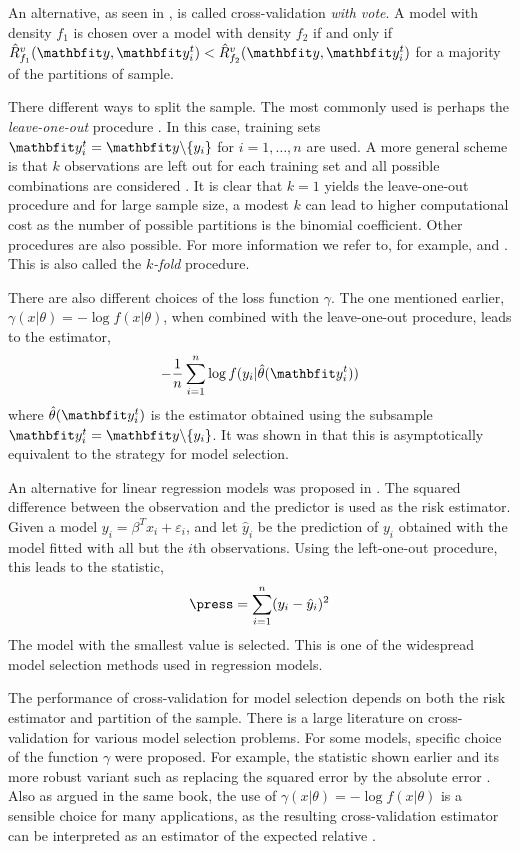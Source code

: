 An alternative, as seen in \cite{Yang:2007vx}, is called cross-validation
\emph{with vote}. A model with density $f_1$ is chosen over a model with
density $f_2$ if and only if $\hat{R}_{f_1}^v(\data,\data_i^t) <
\hat{R}_{f_2}^v(\data,\data_i^t)$ for a majority of the partitions of sample.

There different ways to split the sample. The most commonly used is perhaps
the \emph{leave-one-out} procedure \cite{Stone:1974vx,Geisser:1975vx}. In this
case, training sets $\data_i^t = \data\backslash\{y_i\}$ for $i = 1,\dots,n$
are used. A more general scheme is that $k$ observations are left out for each
training set and all possible combinations are considered \cite{Shao:1993vx}.
It is clear that $k=1$ yields the leave-one-out procedure and for large sample
size, a modest $k$ can lead to higher computational cost as the number of
possible partitions is the binomial coefficient. Other procedures are also
possible. For more information we refer to, for example, \cite{Stone:1978vx}
and \cite{Hjorth:1994vx}. This is also called the $k$\emph{-fold} procedure.

There are also different choices of the loss function $\gamma$. The one
mentioned earlier, $\gamma(x|\theta) = -\log f(x|\theta)$, when combined with
the leave-one-out procedure, leads to the estimator,
\begin{equation}
  -\frac{1}{n}\sum_{i=1}^n\log f(y_i|\hat\theta(\data_i^t))
\end{equation}
where $\hat\theta(\data_i^t)$ is the estimator obtained using the subsample
$\data_i^t = \data\backslash\{y_i\}$. It was shown in \cite{Stone:1978vx} that
this is asymptotically equivalent to the \aic strategy for model selection.

An alternative for linear regression models was proposed in
\cite{Allen:1974vx}. The squared difference between the observation and the
predictor is used as the risk estimator. Given a model $y_i = \beta^T x_i +
\varepsilon_i$, and let $\hat{y}_i$ be the prediction of $y_i$ obtained with
the model fitted with all but the $i$th observations. Using the left-one-out
procedure, this leads to the \press statistic,
\begin{equation}
  \press = \sum_{i=1}^n(y_i - \hat{y}_i)^2
\end{equation}
The model with the smallest \press value is selected. This is one of the
widespread model selection methods used in regression models.

The performance of cross-validation for model selection depends on both the
risk estimator and partition of the sample. There is a large literature on
cross-validation for various model selection problems. For some models,
specific choice of the function $\gamma$ were proposed. For example, the
\press statistic shown earlier and its more robust variant such as replacing
the squared error by the absolute error \cite[][sec.~2.9]{Claeskens:2008tq}.
Also as argued in the same book, the use of $\gamma(x|\theta) = -\log
f(x|\theta)$ is a sensible choice for many applications, as the resulting
cross-validation estimator can be interpreted as an estimator of the expected
relative \kld.

